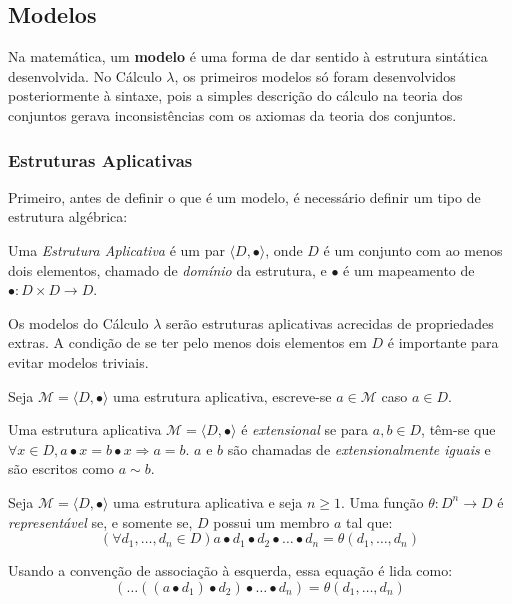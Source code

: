 \documentclass[../main.tex]{subfiles}
\begin{document}
\subsection{Modelos}

Na matemática, um \textbf{modelo} é uma forma de dar sentido à estrutura sintática desenvolvida. No Cálculo $\lambda$, os primeiros modelos só foram desenvolvidos posteriormente à sintaxe, pois a simples descrição do cálculo na teoria dos conjuntos gerava inconsistências com os axiomas da teoria dos conjuntos.

\subsubsection{Estruturas Aplicativas}

Primeiro, antes de definir o que é um modelo, é necessário definir um tipo de estrutura algébrica:

\begin{definition}
    Uma \emph{Estrutura Aplicativa} é um par $\langle D, \bullet \rangle$, onde $D$ é um conjunto com ao menos dois elementos, chamado de \emph{domínio} da estrutura, e $\bullet$ é um mapeamento de $\bullet : D \times D \to D$.
\end{definition}

Os modelos do Cálculo $\lambda$ serão estruturas aplicativas acrecidas de propriedades extras. A condição de se ter pelo menos dois elementos em $D$ é importante para evitar modelos triviais.

Seja $\mathcal{M} = \langle D, \bullet \rangle$ uma estrutura aplicativa, escreve-se $a \in \mathcal{M}$ caso $a \in D$.

\begin{definition}
    Uma estrutura aplicativa $\mathcal{M} = \langle D, \bullet \rangle$ é \emph{extensional} se para $a, b \in D$, têm-se que $\forall x \in D, a \bullet x = b \bullet x \Rightarrow a = b$. $a$ e $b$ são chamadas de \emph{extensionalmente iguais} e são escritos como $a \sim b$.
\end{definition}

\begin{definition}
    Seja $\mathcal{M} = \langle D, \bullet \rangle$ uma estrutura aplicativa e seja $n \geq 1$. Uma função $\theta : D^n \to D$ é \emph{representável} se, e somente se, $D$ possui um membro $a$ tal que: $$(\forall d_1, \dots, d_n \in D) a \bullet d_1 \bullet d_2 \bullet \dots \bullet d_n = \theta(d_1, \dots, d_n)$$

    Usando a convenção de associação à esquerda, essa equação é lida como: $$(\dots((a \bullet d_1) \bullet d_2) \bullet \dots \bullet d_n) = \theta(d_1, \dots, d_n)$$
\end{definition}
\end{document}
